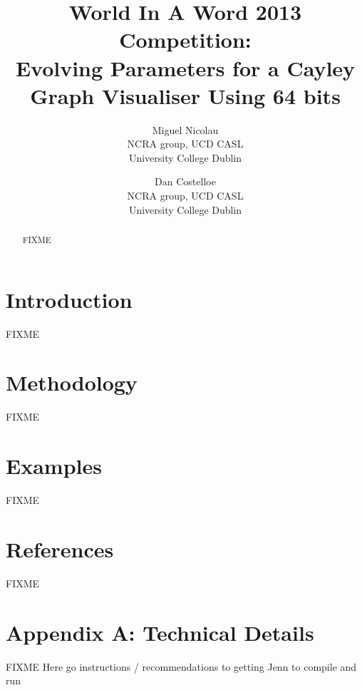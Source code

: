 \documentclass{article}
\title{World In A Word 2013 Competition:\\ Evolving Parameters for a Cayley Graph Visualiser Using 64 bits}
\author{Miguel Nicolau\\
NCRA group, UCD CASL\\
University College Dublin
\and Dan Costelloe\\
NCRA group, UCD CASL\\
University College Dublin}
\date{}
\begin{document}
\maketitle
\begin{abstract}
FIXME
\end{abstract}

\section{Introduction}
FIXME

\section{Methodology}
FIXME

\section{Examples}
FIXME

\section*{References}
FIXME

\section*{Appendix A: Technical Details}
FIXME Here go instructions / recommendations to getting Jenn to compile and run
\end{document}
